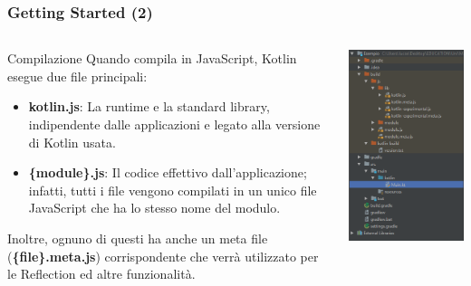     \begin{frame}
      \frametitle{Getting Started (2)}
      \begin{columns}
        \begin{column}{0.5\textwidth}
          \begin{block}{Compilazione}
            Quando compila in JavaScript, Kotlin esegue \alert{due} file principali:
            \begin{itemize}
              \item \textbf{kotlin.js}: La runtime e la standard library, indipendente dalle applicazioni e legato
              alla versione di Kotlin usata.
              \item \textbf{\{module\}.js}: Il codice effettivo dall'applicazione; infatti, tutti i file vengono compilati
              in un unico file JavaScript che ha lo stesso nome del modulo.
            \end{itemize}
            Inoltre, ognuno di questi ha anche un meta file (\textbf{\{file\}.meta.js}) corrispondente che verrà
            utilizzato per le Reflection ed altre funzionalità.
          \end{block}
        \end{column}
        \begin{column}{0.47\textwidth}
          \begin{center}
            \includegraphics[scale=0.5]{ProjectStructure}
          \end{center}
        \end{column}
      \end{columns}

    \end{frame}

